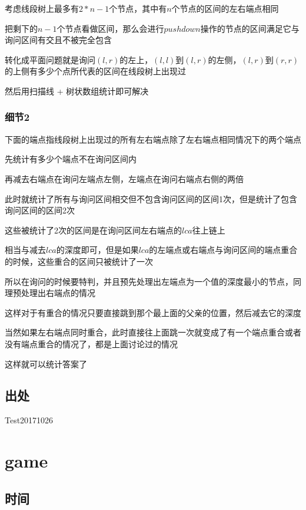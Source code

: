 \documentclass[a4paper]{article}
\begin{document}
			考虑线段树上最多有$2 * n - 1 $个节点，其中有$n$个节点的区间的左右端点相同
			
			把剩下的$n - 1$个节点看做区间，那么会进行$pushdown$操作的节点的区间满足它与询问区间有交且不被完全包含
			
			转化成平面问题就是询问$(l,r)$的左上，$(l,l)$到$(l,r)$的左侧，$(l,r)$到$(r,r)$的上侧有多少个点所代表的区间在线段树上出现过
			
			然后用扫描线 + 树状数组统计即可解决
		
		\subsubsection{细节2}
				
			下面的端点指线段树上出现过的所有左右端点除了左右端点相同情况下的两个端点
				
			先统计有多少个端点不在询问区间内
			
			再减去右端点在询问左端点左侧，左端点在询问右端点右侧的两倍
			
			此时就统计了所有与询问区间相交但不包含询问区间的区间1次，但是统计了包含询问区间的区间2次
			
			这些被统计了2次的区间是在询问区间左右端点的$lca$往上链上
			
			相当与减去$lca$的深度即可，但是如果$lca$的左端点或右端点与询问区间的端点重合的时候，这些重合的区间只被统计了一次
			
			所以在询问的时候要特判，并且预先处理出左端点为一个值的深度最小的节点，同理预处理出右端点的情况
			
			这样对于有重合的情况只要直接跳到那个最上面的父亲的位置，然后减去它的深度
			
			当然如果左右端点同时重合，此时直接往上面跳一次就变成了有一个端点重合或者没有端点重合的情况了，都是上面讨论过的情况
				
			这样就可以统计答案了	
			
	\subsection{出处}
		
		Test20171026
	
	\newpage
	
	\section{game}
		
	\subsection{时间}
		
\end{document}
